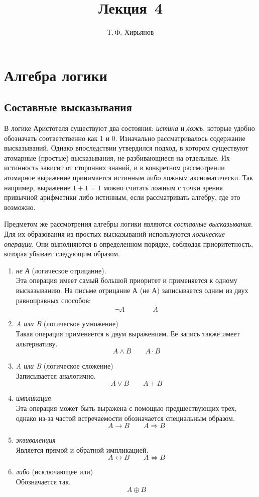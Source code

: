 \documentclass[a4paper, fleqn]{article}
\title{Лекция \textnumero\,4}
\author{Т.\,Ф. Хирьянов}
\date{}
\begin{document}
	\section*{Алгебра логики}
	\subsection*{Составные высказывания}
	
	В логике Аристотеля существуют два состояния: \emph{истина} и \emph{ложь}, которые удобно обозначать соответственно как 1 и 0. 
	Изначально рассматривалось содержание высказываний. Однако впоследствии утвердился подход, в котором существуют атомарные (простые) высказывания, не разбивающиеся на отдельные. Их истинность зависит от сторонних знаний, и в конкретном рассмотрении атомарное выражение принимается истинным либо ложным аксиоматически. Так например, выражение 
	$1+1=1$
	можно считать ложным с точки зрения привычной арифметики либо истинным, если рассматривать алгебру, где это возможно. 
	
	Предметом же рассмотрения алгебры логики являются \emph{составные высказывания}. Для их образования из простых высказываний используются \emph{логические операции}. Они выполняются в определенном порядке, соблюдая приоритетность, которая убывает следующим образом.
	\begin{enumerate}
		\item \emph{не А} (логическое отрицание). \\
		Эта операция имеет самый большой приоритет и применяется к одному высказыванию. На письме отрицание А (не А) записывается одним из двух равноправных способов:
		\[\neg A \qquad \qquad \bar{A}\]
		\item \emph{A или B} (логическое умножение)\\
		Такая операция применяется к двум выражениям. Ее запись также имеет альтернативу.
		\[A \wedge B \qquad A \cdot B\]
		\item \emph{A или B} (логическое сложение)\\
		Записывается аналогично.
		\[A \vee B \qquad A + B\]
		\item \emph{импликация} \\
		Эта операция может быть выражена с помощью предшествующих трех, однако из-за частой встречаемости обозначается специальным образом.
		\[A \rightarrow B \qquad A \Rightarrow B\]
		\item \emph{эквиваленция}\\
		Является прямой и обратной импликацией. 
		\[A \leftrightarrow B \qquad A \Leftrightarrow B\]
		\item \emph{либо} (исключающее или)\\
		Обозначается так.
		\[A \oplus B\]
		
	\end{enumerate}
	
\end{document}
